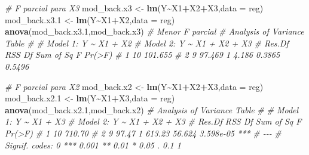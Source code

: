 \documentclass[
]{book}
\newenvironment{Shaded}{\begin{snugshade}}{\end{snugshade}}
\newcommand{\CommentTok}[1]{\textcolor[rgb]{0.56,0.35,0.01}{\textit{#1}}}
\newcommand{\DataTypeTok}[1]{\textcolor[rgb]{0.13,0.29,0.53}{#1}}
\newcommand{\FloatTok}[1]{\textcolor[rgb]{0.00,0.00,0.81}{#1}}
\newcommand{\KeywordTok}[1]{\textcolor[rgb]{0.13,0.29,0.53}{\textbf{#1}}}
\newcommand{\NormalTok}[1]{#1}
\newcommand{\OperatorTok}[1]{\textcolor[rgb]{0.81,0.36,0.00}{\textbf{#1}}}
\newcommand{\StringTok}[1]{\textcolor[rgb]{0.31,0.60,0.02}{#1}}
\numberwithin{equation}{section}
\begin{document}
\begin{Shaded}
\begin{Highlighting}[]
\CommentTok{\# F parcial para X3}
\NormalTok{mod\_back.x3 \textless{}{-}}\StringTok{ }\KeywordTok{lm}\NormalTok{(Y}\OperatorTok{\textasciitilde{}}\NormalTok{X1}\OperatorTok{+}\NormalTok{X2}\OperatorTok{+}\NormalTok{X3,}\DataTypeTok{data =}\NormalTok{ reg)}
\NormalTok{mod\_back.x3}\FloatTok{.1}\NormalTok{ \textless{}{-}}\StringTok{ }\KeywordTok{lm}\NormalTok{(Y}\OperatorTok{\textasciitilde{}}\NormalTok{X1}\OperatorTok{+}\NormalTok{X2,}\DataTypeTok{data =}\NormalTok{ reg)}
\KeywordTok{anova}\NormalTok{(mod\_back.x3}\FloatTok{.1}\NormalTok{,mod\_back.x3) }\CommentTok{\# Menor F parcial}
\CommentTok{\# Analysis of Variance Table}
\CommentTok{\# }
\CommentTok{\# Model 1: Y \textasciitilde{} X1 + X2}
\CommentTok{\# Model 2: Y \textasciitilde{} X1 + X2 + X3}
\CommentTok{\#   Res.Df     RSS Df Sum of Sq      F Pr(\textgreater{}F)}
\CommentTok{\# 1     10 101.655                           }
\CommentTok{\# 2      9  97.469  1     4.186 0.3865 0.5496}

\CommentTok{\# F parcial para X2}
\NormalTok{mod\_back.x2 \textless{}{-}}\StringTok{ }\KeywordTok{lm}\NormalTok{(Y}\OperatorTok{\textasciitilde{}}\NormalTok{X1}\OperatorTok{+}\NormalTok{X2}\OperatorTok{+}\NormalTok{X3,}\DataTypeTok{data =}\NormalTok{ reg)}
\NormalTok{mod\_back.x2}\FloatTok{.1}\NormalTok{ \textless{}{-}}\StringTok{ }\KeywordTok{lm}\NormalTok{(Y}\OperatorTok{\textasciitilde{}}\NormalTok{X1}\OperatorTok{+}\NormalTok{X3,}\DataTypeTok{data =}\NormalTok{ reg)}
\KeywordTok{anova}\NormalTok{(mod\_back.x2}\FloatTok{.1}\NormalTok{,mod\_back.x2)}
\CommentTok{\# Analysis of Variance Table}
\CommentTok{\# }
\CommentTok{\# Model 1: Y \textasciitilde{} X1 + X3}
\CommentTok{\# Model 2: Y \textasciitilde{} X1 + X2 + X3}
\CommentTok{\#   Res.Df    RSS Df Sum of Sq      F    Pr(\textgreater{}F)    }
\CommentTok{\# 1     10 710.70                                  }
\CommentTok{\# 2      9  97.47  1    613.23 56.624 3.598e{-}05 ***}
\CommentTok{\# {-}{-}{-}}
\CommentTok{\# Signif. codes:  0 \textquotesingle{}***\textquotesingle{} 0.001 \textquotesingle{}**\textquotesingle{} 0.01 \textquotesingle{}*\textquotesingle{} 0.05 \textquotesingle{}.\textquotesingle{} 0.1 \textquotesingle{} \textquotesingle{} 1}


\end{Highlighting}
\end{Shaded}
\end{document}
